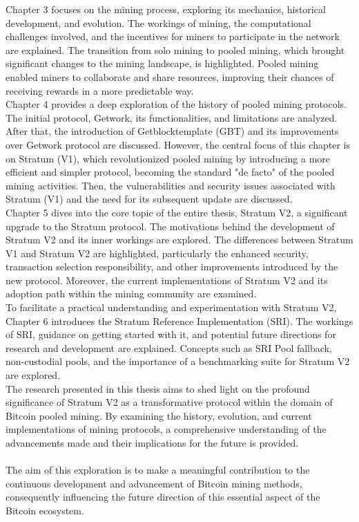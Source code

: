 Chapter 3 focuses on the mining process, exploring its mechanics, historical development, and evolution. The workings of mining, the computational challenges involved, and the incentives for miners to participate in the network are explained. The transition from solo mining to pooled mining, which brought significant changes to the mining landscape, is highlighted. Pooled mining enabled miners to collaborate and share resources, improving their chances of receiving rewards in a more predictable way.\\
Chapter 4 provides a deep exploration of the history of pooled mining protocols. The initial protocol, Getwork, its functionalities, and limitations are analyzed. After that, the introduction of Getblocktemplate (GBT) and its improvements over Getwork protocol are discussed. However, the central focus of this chapter is on Stratum (V1), which revolutionized pooled mining by introducing a more efficient and simpler protocol, becoming the standard "de facto" of the pooled mining activities. Then, the vulnerabilities and security issues associated with Stratum (V1) and the need for its subsequent update are discussed.\\
Chapter 5 dives into the core topic of the entire thesis, Stratum V2, a significant upgrade to the Stratum protocol. The motivations behind the development of Stratum V2 and its inner workings are explored. The differences between Stratum V1 and Stratum V2 are highlighted, particularly the enhanced security, transaction selection responsibility, and other improvements introduced by the new protocol. Moreover, the current implementations of Stratum V2 and its adoption path within the mining community are examined.\\
To facilitate a practical understanding and experimentation with Stratum V2, Chapter 6 introduces the Stratum Reference Implementation (SRI). The workings of SRI, guidance on getting started with it, and potential future directions for research and development are explained. Concepts such as SRI Pool fallback, non-custodial pools, and the importance of a benchmarking suite for Stratum V2 are explored.\\
The research presented in this thesis aims to shed light on the profound significance of Stratum V2 as a transformative protocol within the domain of Bitcoin pooled mining. By examining the history, evolution, and current implementations of mining protocols, a comprehensive understanding of the advancements made and their implications for the future is provided.\\\\
The aim of this exploration is to make a meaningful contribution to the continuous development and advancement of Bitcoin mining methods, consequently influencing the future direction of this essential aspect of the Bitcoin ecosystem.
